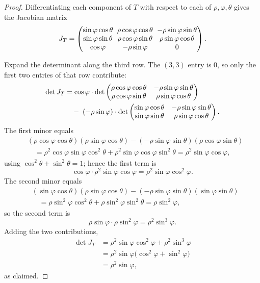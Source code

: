 \begin{proof}
Differentiating each component of $T$ with respect to each of $\rho,\varphi,\theta$ gives the Jacobian matrix
\[
\setlength{\arraycolsep}{3pt}
J_T = \begin{pmatrix} \sin\varphi\cos\theta & \rho\cos\varphi\cos\theta & -\rho\sin\varphi\sin\theta \\ \sin\varphi\sin\theta & \rho\cos\varphi\sin\theta & \rho\sin\varphi\cos\theta \\ \cos\varphi & -\rho\sin\varphi & 0 \end{pmatrix}.
\]

Expand the determinant along the third row. The $(3,3)$ entry is $0$, so only the first two entries of that row contribute:
\begin{align*}
\setlength{\arraycolsep}{3pt}
\det J_T &= \cos\varphi \cdot \det\begin{pmatrix} \rho\cos\varphi\cos\theta & -\rho\sin\varphi\sin\theta \\ \rho\cos\varphi\sin\theta & \rho\sin\varphi\cos\theta \end{pmatrix} \\
&\quad -\; (-\rho\sin\varphi)\cdot \det\begin{pmatrix} \sin\varphi\cos\theta & -\rho\sin\varphi\sin\theta \\ \sin\varphi\sin\theta & \rho\sin\varphi\cos\theta \end{pmatrix}.
\end{align*}
The first minor equals
\begin{align*}
&(\rho\cos\varphi\cos\theta)(\rho\sin\varphi\cos\theta) - (-\rho\sin\varphi\sin\theta)(\rho\cos\varphi\sin\theta) \\
&\quad= \rho^2\cos\varphi\sin\varphi\cos^2\theta + \rho^2\sin\varphi\cos\varphi\sin^2\theta = \rho^2\sin\varphi\cos\varphi,
\end{align*}
using $\cos^2\theta+\sin^2\theta=1$; hence the first term is
\[
\cos\varphi \cdot \rho^2\sin\varphi\cos\varphi = \rho^2\sin\varphi\cos^2\varphi.
\]
The second minor equals
\begin{align*}
&(\sin\varphi\cos\theta)(\rho\sin\varphi\cos\theta) - (-\rho\sin\varphi\sin\theta)(\sin\varphi\sin\theta) \\
&\quad= \rho\sin^2\varphi\cos^2\theta + \rho\sin^2\varphi\sin^2\theta = \rho\sin^2\varphi,
\end{align*}
so the second term is
\[
\rho\sin\varphi \cdot \rho\sin^2\varphi = \rho^2\sin^3\varphi.
\]
Adding the two contributions,
\[
\begin{aligned}
\det J_T &= \rho^2\sin\varphi\cos^2\varphi + \rho^2\sin^3\varphi \\
&= \rho^2\sin\varphi\big(\cos^2\varphi+\sin^2\varphi\big) \\
&= \rho^2\sin\varphi,
\end{aligned}
\]
as claimed.
\end{proof}

